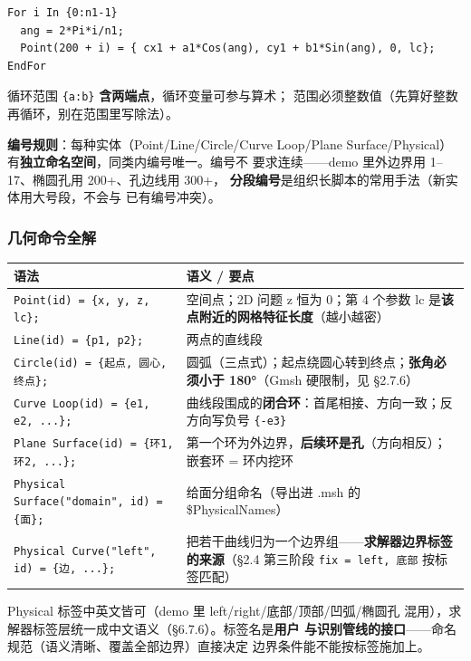 \documentclass[12pt,a4paper]{ctexart}
\newcommand{\fem}{\Verb}
\begin{document}
\begin{lstlisting}
For i In {0:n1-1}
  ang = 2*Pi*i/n1;
  Point(200 + i) = { cx1 + a1*Cos(ang), cy1 + b1*Sin(ang), 0, lc};
EndFor
\end{lstlisting}

循环范围 \fem|{a:b}| \textbf{含两端点}，循环变量可参与算术；
范围必须整数值（先算好整数再循环，别在范围里写除法）。

\textbf{编号规则}：每种实体（Point/Line/Circle/Curve Loop/Plane
Surface/Physical）有\textbf{独立命名空间}，同类内编号唯一。编号不
要求连续——demo 里外边界用 1--17、椭圆孔用 200+、孔边线用 300+，
\textbf{分段编号}是组织长脚本的常用手法（新实体用大号段，不会与
已有编号冲突）。

\subsubsection{几何命令全解}

\small
\begin{longtable}{p{8.4cm}p{6.1cm}}
\toprule
\textbf{语法} & \textbf{语义 / 要点} \\
\midrule
\fem|Point(id) = {x, y, z, lc};| & 空间点；2D 问题 z 恒为 0；第 4 个参数 lc 是\textbf{该点附近的网格特征长度}（越小越密） \\
\fem|Line(id) = {p1, p2};| & 两点的直线段 \\
\fem|Circle(id) = {起点, 圆心, 终点};| & 圆弧（三点式）；起点绕圆心转到终点；\textbf{张角必须小于 180°}（Gmsh 硬限制，见 §2.7.6） \\
\fem|Curve Loop(id) = {e1, e2, ...};| & 曲线段围成的\textbf{闭合环}：首尾相接、方向一致；反方向写负号 \fem|{-e3}| \\
\fem|Plane Surface(id) = {环1, 环2, ...};| & 第一个环为外边界，\textbf{后续环是孔}（方向相反）；嵌套环 = 环内挖环 \\
\fem|Physical Surface("domain", id) = {面};| & 给面分组命名（导出进 .msh 的 \$PhysicalNames） \\
\fem|Physical Curve("left", id) = {边, ...};| & 把若干曲线归为一个边界组——\textbf{求解器边界标签的来源}（§2.4 第三阶段 \fem|fix = left, 底部| 按标签匹配） \\
\bottomrule
\end{longtable}
\normalsize

Physical 标签中英文皆可（demo 里 left/right/底部/顶部/凹弧/椭圆孔
混用），求解器标签层统一成中文语义（§6.7.6）。标签名是\textbf{用户
与识别管线的接口}——命名规范（语义清晰、覆盖全部边界）直接决定
边界条件能不能按标签施加上。
\end{document}
